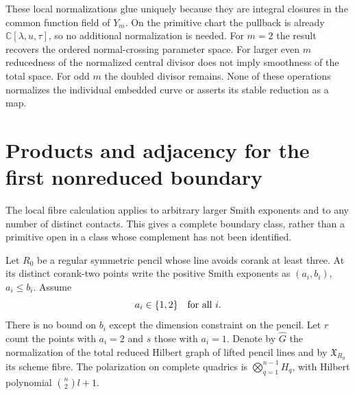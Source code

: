 \documentclass[11pt,reqno]{amsart}
\numberwithin{equation}{section}
\theoremstyle{definition}\newtheorem{definition}[theorem]{Definition}
\theoremstyle{remark}\newtheorem{remark}[theorem]{Remark}
\newcommand{\C}{\mathbb C}\newcommand{\Q}{\mathbb Q}
\begin{document}
These local normalizations glue uniquely because they are integral
closures in the common function field of $Y_m$. On the primitive
chart the pullback is already $\C[\lambda,u,\tau]$, so no additional
normalization is needed. For $m=2$ the result recovers the ordered
normal-crossing parameter space. For larger even $m$ reducedness of
the normalized central divisor does not imply smoothness of the
total space. For odd $m$ the doubled divisor remains. None of these
operations normalizes the individual embedded curve or asserts its
stable reduction as a map.

\section{Products and adjacency for the first nonreduced boundary}
\label{sec:products-v163}
The local fibre calculation applies to arbitrary larger Smith exponents
and to any number of distinct contacts. This gives a complete boundary
class, rather than a primitive open in a class whose complement has
not been identified.

Let $R_0$ be a regular symmetric pencil whose line avoids corank at
least three. At its distinct corank-two points write the positive
Smith exponents as $(a_i,b_i)$, $a_i\leq b_i$. Assume
\begin{equation}\label{eq:first-boundary-class-v163}
                      a_i\in\{1,2\}\quad\hbox{for all }i.
\end{equation}
There is no bound on $b_i$ except the dimension constraint on the
pencil. Let $r$ count the points with $a_i=2$ and $s$ those with
$a_i=1$. Denote by $\widehat G$ the normalization of the total reduced
Hilbert graph of lifted pencil lines and by $\mathfrak X_{R_0}$ its
scheme fibre. The polarization on complete quadrics is
$\bigotimes_{q=1}^{n-1}H_q$, with Hilbert polynomial $\binom n2l+1$.
\end{document}
